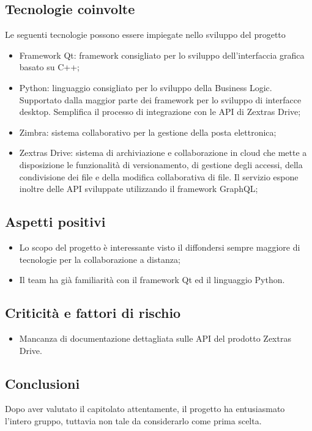   \subsection{Tecnologie coinvolte}
 Le seguenti tecnologie possono essere impiegate nello sviluppo del progetto
\begin{itemize}
    \item Framework Qt: framework consigliato per lo sviluppo dell'interfaccia grafica basato su C++;
    \item Python: linguaggio consigliato per lo sviluppo della Business Logic. Supportato dalla maggior parte dei framework per lo sviluppo di interfacce desktop. Semplifica il processo di integrazione con le API di Zextras Drive;
    \item Zimbra: sistema collaborativo per la gestione della posta elettronica;
    \item Zextras Drive: sistema di archiviazione e collaborazione in cloud che mette a disposizione le funzionalità di versionamento, di gestione degli accessi, della condivisione dei file e della modifica collaborativa di file. Il servizio espone inoltre delle API sviluppate utilizzando il framework GraphQL;
\end{itemize}

\subsection{Aspetti positivi}
\begin{itemize}
\item Lo scopo del progetto è interessante visto il diffondersi sempre maggiore di tecnologie per la collaborazione a distanza;
\item Il team ha già familiarità con il framework Qt ed il linguaggio Python.
\end{itemize}

\subsection{Criticità e fattori di rischio}
\begin{itemize}
\item Mancanza di documentazione dettagliata sulle API del prodotto Zextras Drive.
\end{itemize}

  \subsection{Conclusioni}
  Dopo aver valutato il capitolato attentamente, il progetto ha entusiasmato l'intero gruppo, tuttavia non tale da considerarlo come prima scelta.
